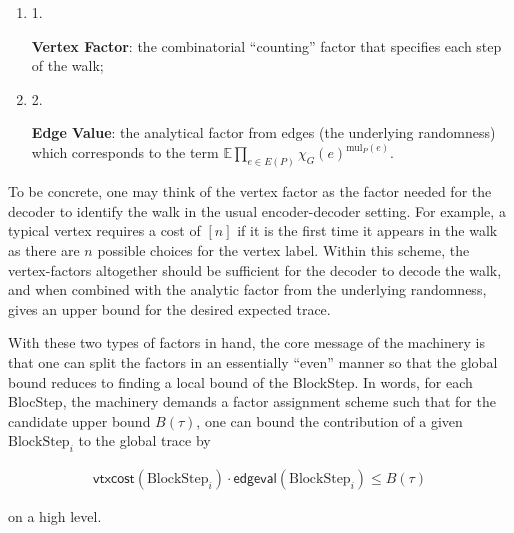 \begin{enumerate}


\item[] 
1. 


\textbf{Vertex Factor}: the combinatorial “counting” factor that specifies each step of the walk;\par





\item[] 
2. 


\textbf{Edge Value}: the analytical factor from edges (the underlying randomness) which corresponds to the term $\mathbb{E}\prod_{e\in E(P)}\chi_{G}(e)^{\text{mul}_{P}(e)}$.\par





\end{enumerate}




To be concrete, one may think of the vertex factor as the factor needed for the decoder to identify the walk in the usual encoder-decoder setting. For example, a typical vertex requires a cost of $[n]$ if it is the first time it appears in the walk as there are $n$ possible choices for the vertex label. Within this scheme, the vertex-factors altogether should be sufficient for the decoder to decode the walk, and when combined with the analytic factor from the underlying randomness, gives an upper bound for the desired expected trace.\par




With these two types of factors in hand, the core message of the machinery is that one can split the factors in an essentially “even” manner so that the global bound reduces to finding a local bound of the BlockStep. In words, for each BlocStep, the machinery demands a factor assignment scheme such that for the candidate upper bound $B(\tau)$, one can bound the contribution of a given $\text{BlockStep}_{i}$ to the global trace by\par


\[\begin{gathered}
\mathsf{vtxcost}(\text{BlockStep}_{i})\cdot\mathsf{edgeval}(\text{BlockStep}_{i})\leq B(\tau)
\end{gathered}\]


on a high level.\par




